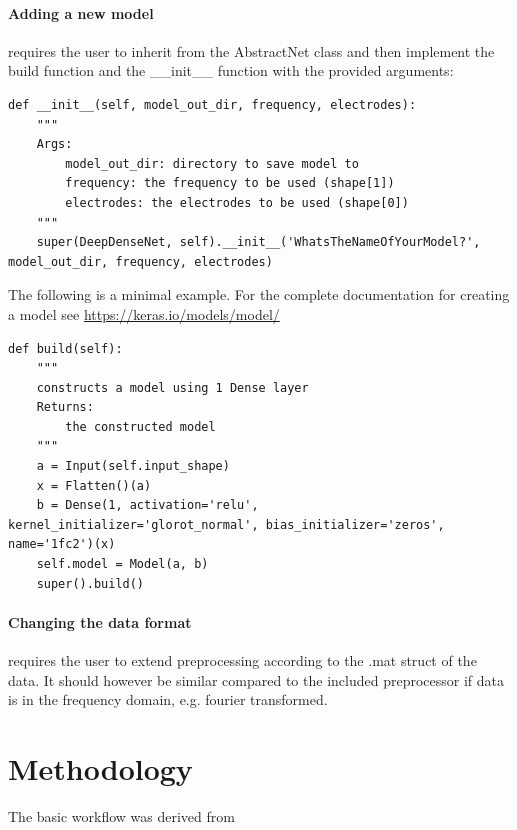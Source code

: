 \documentclass[a4paper]{report}
\begin{document}
    \paragraph{Adding a new model} requires the user to inherit from the AbstractNet class and then implement the build
    function and the \_\_init\_\_ function with the provided arguments: \\
    \begin{lstlisting}
def __init__(self, model_out_dir, frequency, electrodes):
    """
    Args:
        model_out_dir: directory to save model to
        frequency: the frequency to be used (shape[1])
        electrodes: the electrodes to be used (shape[0])
    """
    super(DeepDenseNet, self).__init__('WhatsTheNameOfYourModel?', model_out_dir, frequency, electrodes)
    \end{lstlisting}
     The following is a minimal example. For the complete documentation for creating a model see
        \href{https://keras.io/models/model/}{https://keras.io/models/model/} \\
    \begin{lstlisting}
def build(self):
    """
    constructs a model using 1 Dense layer
    Returns:
        the constructed model
    """
    a = Input(self.input_shape)
    x = Flatten()(a)
    b = Dense(1, activation='relu', kernel_initializer='glorot_normal', bias_initializer='zeros', name='1fc2')(x)
    self.model = Model(a, b)
    super().build()
    \end{lstlisting}

    \paragraph{Changing the data format} requires the user to extend preprocessing according to the .mat struct of the
        data. It should however be similar compared to the included preprocessor if data is in the frequency domain,
        e.g. fourier transformed.

\section{Methodology}
The basic workflow was derived from \cite{Tzallas2007AutomaticSD}
\end{document}
